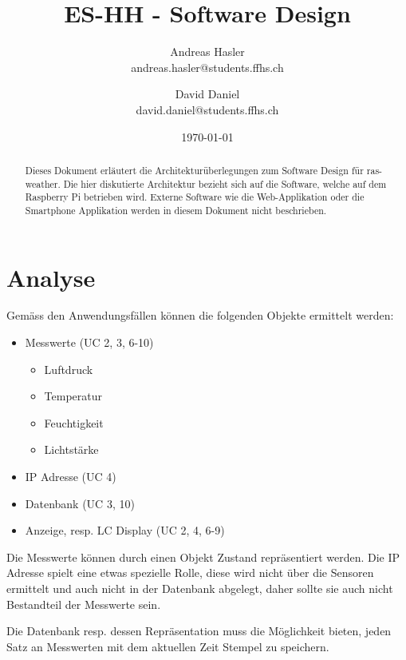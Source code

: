 \documentclass[
    10pt,
    a4paper,
]{scrartcl}
\title{ES-HH - Software Design}
\author{Andreas Hasler \\{\small andreas.hasler@students.ffhs.ch}
\and David Daniel\\{\small david.daniel@students.ffhs.ch}}
\date{\today}
\begin{document}
\maketitle
{}%

\begin{abstract}
    Dieses Dokument erläutert die Architekturüberlegungen zum Software Design für
    ras-weather. Die hier diskutierte Architektur bezieht sich auf die Software, welche
    auf dem Raspberry Pi betrieben wird. Externe Software wie die Web-Applikation oder die
    Smartphone Applikation werden in diesem Dokument nicht beschrieben.
\end{abstract}

\clearpage
{}%
\tableofcontents

\section{Analyse}

Gemäss den Anwendungsfällen \cite{project-doc} können die folgenden Objekte ermittelt
werden:

\begin{itemize}
    \item Messwerte (UC 2, 3, 6-10)
        \begin{itemize}
            \item Luftdruck
            \item Temperatur
            \item Feuchtigkeit
            \item Lichtstärke
        \end{itemize}
    \item IP Adresse (UC 4)
    \item Datenbank (UC 3, 10)
    \item Anzeige, resp. LC Display (UC 2, 4, 6-9)
\end{itemize}

Die Messwerte können durch einen Objekt Zustand repräsentiert werden. Die IP Adresse
spielt eine etwas spezielle Rolle, diese wird nicht über die Sensoren ermittelt und auch
nicht in der Datenbank abgelegt, daher sollte sie auch nicht Bestandteil der Messwerte
sein.

Die Datenbank resp. dessen Repräsentation muss die Möglichkeit bieten, jeden Satz an
Messwerten mit dem aktuellen Zeit Stempel zu speichern.
\end{document}
